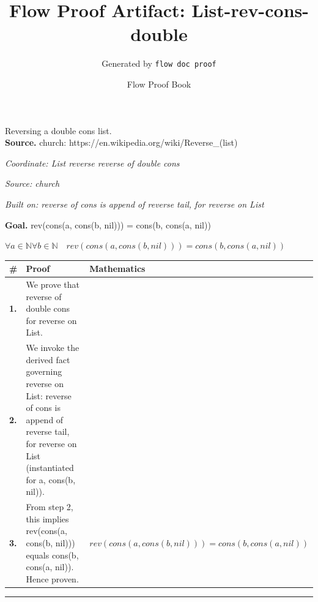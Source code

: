 \documentclass[11pt]{article}
\title{Flow Proof Artifact: List-rev-cons-double}
\author{Generated by \texttt{flow doc proof}}
\date{Flow Proof Book}
\theoremstyle{definition}
\begin{document}
\maketitle
Reversing a double cons list.\\[0.5em]
\textbf{Source.} church: https://en.wikipedia.org/wiki/Reverse\_(list)\\[0.5em]
\bigskip
{}\par
\smallskip\noindent\textit{Coordinate: List \cdot reverse \cdot reverse of double cons}\par
\smallskip\noindent\textit{Source: church}\par
\smallskip\noindent\textit{Built on: reverse of cons is append of reverse tail, for reverse on List}\par
\medskip
\noindent\textbf{Goal.} rev(cons(a, cons(b, nil))) = cons(b, cons(a, nil))\par
\noindent$\displaystyle \forall a \in \mathbb{N} \forall b \in \mathbb{N}\quad rev(cons(a, cons(b, nil))) = cons(b, cons(a, nil))$\par
\medskip
\noindent
\begin{tabular}{@{} >{\raggedright\arraybackslash}p{} >{\raggedright\arraybackslash}p{} >{\raggedleft\arraybackslash}p{} @{}}
\textbf{\#} & \textbf{Proof} & \textbf{Mathematics} \\
\midrule
\textbf{1.} & We prove that reverse of double cons for reverse on List. & \\[0.45em]
\textbf{2.} & We invoke the derived fact governing reverse on List: reverse of cons is append of reverse tail, for reverse on List (instantiated for a, cons(b, nil)). & \\[0.45em]
\textbf{3.} & From step 2, this implies rev(cons(a, cons(b, nil))) equals cons(b, cons(a, nil)). Hence proven. & $\displaystyle rev(cons(a, cons(b, nil))) = cons(b, cons(a, nil))$ \\[0.45em]
\bottomrule
\end{tabular}
\label{thm:List-reverse-reverse_of_double_cons}
\par\medskip\hrule
\end{document}
